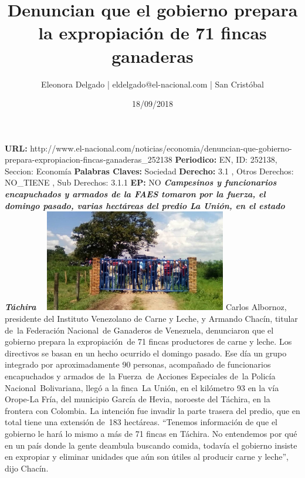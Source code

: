 \documentclass{article}%
\title{\textbf{Denuncian que el gobierno prepara la expropiación de 71 fincas ganaderas}}%
\author{Eleonora Delgado | eldelgado@el{-}nacional.com | San Cristóbal}%
\date{18/09/2018}%
\begin{document}
%
\normalsize%
\maketitle%
\textbf{URL: }%
http://www.el{-}nacional.com/noticias/economia/denuncian{-}que{-}gobierno{-}prepara{-}expropiacion{-}fincas{-}ganaderas\_252138\newline%
%
\textbf{Periodico: }%
EN, %
ID: %
252138, %
Seccion: %
Economía\newline%
%
\textbf{Palabras Claves: }%
Sociedad\newline%
%
\textbf{Derecho: }%
3.1%
, Otros Derechos: %
NO\_TIENE%
, Sub Derechos: %
3.1.1%
\newline%
%
\textbf{EP: }%
NO\newline%
\newline%
%
\textbf{\textit{Campesinos y funcionarios encapuchados y armados de la FAES tomaron por la fuerza, el domingo pasado, varias hectáreas del predio La Unión, en el estado Táchira ~}}%
\newline%
\newline%
%
\includegraphics[width=300px]{254.jpg}%
\newline%
%
Carlos Albornoz, presidente del Instituto Venezolano de Carne y Leche, y Armando Chacín, titular de~la Federación Nacional~de Ganaderos de Venezuela, denunciaron que el gobierno prepara la expropiación~de 71 fincas productores de carne y leche.%
\newline%
%
Los directivos se basan en un hecho ocurrido el domingo pasado. Ese día un grupo integrado por aproximadamente 90 personas, acompañado de funcionarios encapuchados y armados de~la Fuerza~de Acciones Especiales de~la Policía Nacional~Bolivariana, llegó a la finca~La Unión, en el kilómetro 93 en la vía Orope{-}La Fría, del municipio García de Hevia, noroeste del Táchira, en la frontera con Colombia. La intención fue invadir la parte trasera del predio, que en total tiene una extensión de~183 hectáreas.%
\newline%
%
“Tenemos información de que el gobierno le hará lo mismo a más de 71 fincas en Táchira. No entendemos por qué en un país donde la gente deambula buscando comida, todavía el gobierno insiste en expropiar y eliminar unidades que aún son útiles al producir carne y leche”, dijo Chacín.%
\end{document}
